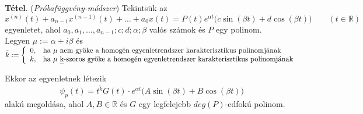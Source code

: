 \documentclass[12pt,margin=0px]{article}
\makeatletter
\renewcommand\paragraph{%
	\@startsection{paragraph}{4}{0mm}%
	{-\baselineskip}%
	{.5\baselineskip}%
	{\normalfont\normalsize\bfseries}}
\makeatother
\begin{document}
    \noindent \textbf{Tétel}. (\emph{Próbafüggvény-módszer}) Tekintsük az
    \[
        x^{(n)}(t) + a_{n-1}x^{(n-1)}(t) + \ldots + a_{0}x(t) = P(t)e^{\alpha t}\big(c \sin{(\beta t)} + d \cos (\beta t)\big) \qquad (t \in \mathbb{R})
    \]
    egyenletet, ahol $a_0, a_1, \ldots, a_{n-1};c;d;\alpha;\beta$ valós számok és $P$ egy polinom.\\

    \noindent Legyen $\mu := \alpha + i\beta$ és\\
    $\tilde{k} := \left\{\begin{array}{cl}
                    0, & \text{ha}\ \mu\ \text{nem gyöke a homogén egyenletrendszer karakterisztikus polinomjának}\\
                    k, & \text{ha}\ \mu\ \text{\emph{k}-szoros gyöke a homogén egyenletrendszer karakterisztikus polinomjának}
                  \end{array}\right.
    $

    \noindent Ekkor az egyenletnek létezik
    \[
        \psi_{p}(t) = t^{\tilde{k}}G(t) \cdot e^{\alpha t}\big(A \sin(\beta t) + B \cos (\beta t)\big)
    \]
    alakú megoldása, ahol $A, B \in \mathbb{R}$ és $G$ egy legfelejebb  $deg(P)$-edfokú polinom.




\end{document}
